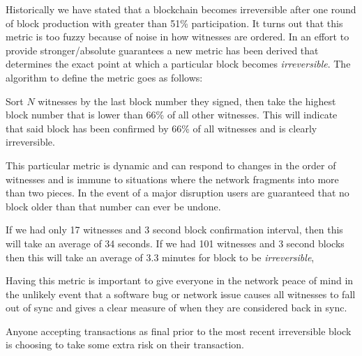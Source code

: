 Historically we have stated that a blockchain becomes irreversible after one
round of block production with greater than 51\% participation. It turns out
that this metric is too fuzzy because of noise in how witnesses are ordered. In
an effort to provide stronger/absolute guarantees a new metric has been derived
that determines the exact point at which a particular block becomes
\emph{irreversible}. The algorithm to define the metric goes as follows:

Sort $N$ witnesses by the last block number they signed, then take the highest
block number that is lower than 66\% of all other witnesses. This will indicate
that said block has been confirmed by 66\% of all witnesses and is clearly
irreversible.

This particular metric is dynamic and can respond to changes in the order of
witnesses and is immune to situations where the network fragments into more
than two pieces. In the event of a major disruption users are guaranteed that
no block older than that number can ever be undone. 

If we had only 17 witnesses and 3 second block confirmation interval, then this
will take an average of 34 seconds. If we had 101 witnesses and 3 second blocks
then this will take an average of 3.3 minutes for block to be
\emph{irreversible},

Having this metric is important to give everyone in the network peace of mind
in the unlikely event that a software bug or network issue causes all witnesses
to fall out of sync and gives a clear measure of when they are considered back
in sync.

Anyone accepting transactions as final prior to the most recent irreversible
block is choosing to take some extra risk on their transaction.
